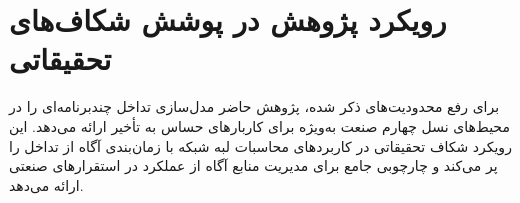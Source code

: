 \section{رویکرد پژوهش در پوشش شکاف‌های تحقیقاتی}

برای رفع محدودیت‌های ذکر شده، پژوهش حاضر مدل‌سازی تداخل چندبرنامه‌ای را در محیط‌های  نسل چهارم صنعت به‌ویژه برای کاربارهای حساس به تأخیر ارائه می‌دهد. این رویکرد شکاف تحقیقاتی در کاربردهای محاسبات لبه شبکه با زمان‌بندی آگاه از تداخل را پر می‌کند و چارچوبی جامع برای مدیریت منابع آگاه از عملکرد در استقرارهای صنعتی  ارائه می‌دهد.